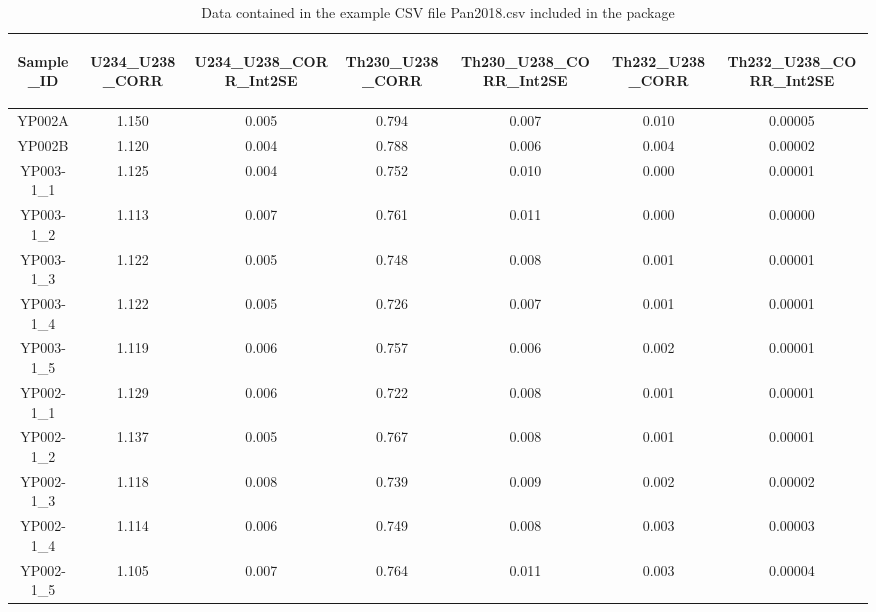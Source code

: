 \documentclass[]{elsarticle} %
\begin{document}
\begin{table}[ht]
\centering
\begin{tabular}{ccccccc}
  \hline
\begin{sideways} Sample\_ID \end{sideways} & \begin{sideways} U234\_U238\_CORR \end{sideways} & \begin{sideways} U234\_U238\_CORR\_Int2SE \end{sideways} & \begin{sideways} Th230\_U238\_CORR \end{sideways} & \begin{sideways} Th230\_U238\_CORR\_Int2SE \end{sideways} & \begin{sideways} Th232\_U238\_CORR \end{sideways} & \begin{sideways} Th232\_U238\_CORR\_Int2SE \end{sideways} \\ 
  \hline
YP002A & 1.150 & 0.005 & 0.794 & 0.007 & 0.010 & 0.00005 \\ 
  YP002B & 1.120 & 0.004 & 0.788 & 0.006 & 0.004 & 0.00002 \\ 
  YP003-1\_1 & 1.125 & 0.004 & 0.752 & 0.010 & 0.000 & 0.00001 \\ 
  YP003-1\_2 & 1.113 & 0.007 & 0.761 & 0.011 & 0.000 & 0.00000 \\ 
  YP003-1\_3 & 1.122 & 0.005 & 0.748 & 0.008 & 0.001 & 0.00001 \\ 
  YP003-1\_4 & 1.122 & 0.005 & 0.726 & 0.007 & 0.001 & 0.00001 \\ 
  YP003-1\_5 & 1.119 & 0.006 & 0.757 & 0.006 & 0.002 & 0.00001 \\ 
  YP002-1\_1 & 1.129 & 0.006 & 0.722 & 0.008 & 0.001 & 0.00001 \\ 
  YP002-1\_2 & 1.137 & 0.005 & 0.767 & 0.008 & 0.001 & 0.00001 \\ 
  YP002-1\_3 & 1.118 & 0.008 & 0.739 & 0.009 & 0.002 & 0.00002 \\ 
  YP002-1\_4 & 1.114 & 0.006 & 0.749 & 0.008 & 0.003 & 0.00003 \\ 
  YP002-1\_5 & 1.105 & 0.007 & 0.764 & 0.011 & 0.003 & 0.00004 \\ 
   \hline
\end{tabular}
\caption{\label{tab:pan}Data contained in the example CSV file Pan2018.csv included in the package} 
\end{table}
\end{document}
